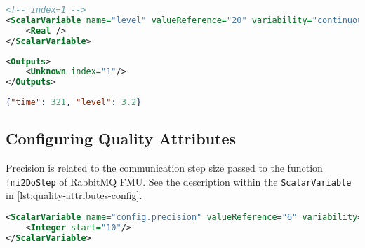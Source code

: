 \begin{lstlisting}[label={lst:fmi-outputs-config},caption={FMI Outputs scalar
    variable configuration of RabbitMQ FMU},language=XML]
<!-- index=1 -->
<ScalarVariable name="level" valueReference="20" variability="continuous" causality="output">
    <Real />
</ScalarVariable>
\end{lstlisting}
\begin{lstlisting}[label={lst:fmi-outputs-config2},caption={FMI Outputs index
    configuration of RabbitMQ FMU },language=XML]
<Outputs>
    <Unknown index="1"/>
</Outputs>
\end{lstlisting}

\begin{lstlisting}[label={lst:message-example},caption={Example of a JSON message.},language=JSON]
{"time": 321, "level": 3.2}
  \end{lstlisting}

\subsection{Configuring Quality Attributes}
\label{subsec:cqa}
Precision is related to the communication step size passed to the function
\texttt{fmi2DoStep} of RabbitMQ FMU. See the description within the
\texttt{Scalar\-Variable} in \cref{lst:quality-attributes-config}.

\begin{lstlisting}[label={lst:quality-attributes-config},caption={Behaviour
configuration of RabbitMQ FMU},language=XML]
<ScalarVariable name="config.precision" valueReference="6" variability="fixed" causality="parameter" description="Communication step comparison precision. Number of decimals to consider" initial="exact">
    <Integer start="10"/>
</ScalarVariable>
  \end{lstlisting}

